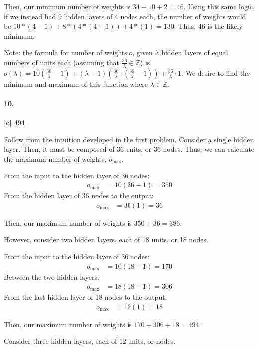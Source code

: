 \documentclass[10pt,letter]{article}
\begin{document}
	Then, our minimum number of weights is $34 + 10 +2= 46$. Using this same logic, if we instead had 9 hidden layers of 4 nodes each, the number of weights would be $10*(4-1) + 8*(4*(4-1)) + 4*(1) = 130$. Thus, 46 is the likely minimum. 

	Note: the formula for number of weights $o$, given $\lambda$ hidden layers of equal numbers of units each (assuming that $\frac{36}{\lambda} \in \mathbb Z$) is $o(\lambda) = 10(\frac{36}{\lambda} - 1) + (\lambda - 1)(\frac{36}{\lambda}\cdot (\frac{36}{\lambda} - 1)) + \frac{36}{\lambda} \cdot 1$. We desire to find the minimum and maximum of this function where $\lambda \in \mathbb Z$. 

\paragraph{10.} \textbf{[c]} 494
	
	Follow from the intuition developed in the first problem. Consider a single hidden layer. Then, it must be composed of 36 units, or 36 nodes. Thus, we can calculate the maximum number of weights, $o_{\text{max}}$.

	From the input to the hidden layer of 36 nodes:
	\begin{align*}
	o_{\text{max}} &= 10(36 - 1) = 350
	\end{align*}
	From the hidden layer of 36 nodes to the output:
	\begin{align*}
	o_{\text{max}} &= 36(1) = 36
	\end{align*}

	Then, our maximum number of weights is $350 + 36 = 386$.

	However, consider two hidden layers, each of 18 units, or 18 nodes.

	From the input to the hidden layer of 36 nodes:
	\begin{align*}
	o_{\text{max}} &= 10(18 - 1) = 170
	\end{align*}
	Between the two hidden layers:
	\begin{align*}
	o_{\text{max}} &= 18(18 - 1) = 306
	\end{align*}
	From the last hidden layer of 18 nodes to the output:
	\begin{align*}
	o_{\text{max}} &= 18(1) = 18
	\end{align*}

	Then, our maximum number of weights is $170 + 306 + 18 = 494$.

	Consider three hidden layers, each of $12$ units, or nodes.
\end{document}
